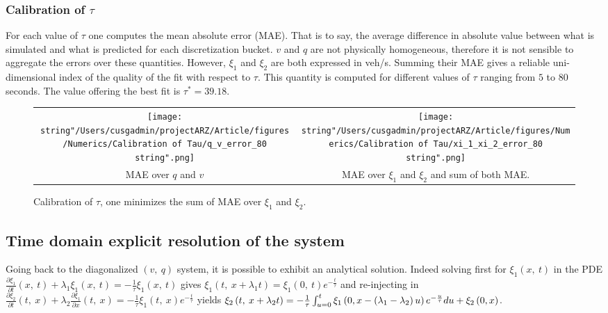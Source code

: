 \documentclass[preprint]{elsarticle}
\begin{document}
\subsubsection{Calibration of $\tau$\label{sub:Calibration-of-tau}}

For each value of $\tau$ one computes the mean absolute error (MAE).
That is to say, the average difference in absolute value between what
is simulated and what is predicted for each discretization bucket.
$v$ and $q$ are not physically homogeneous, therefore it is not
sensible to aggregate the errors over these quantities. However, $\xi_{1}$
and $\xi_{2}$ are both expressed in veh/s. Summing their MAE gives
a reliable uni-dimensional index of the quality of the fit with respect
to $\tau$. This quantity is computed for different values of $\tau$
ranging from $5$ to $80$ seconds. The value offering the best fit
is $\tau^{*}=39.18$.

\begin{figure}
\begin{centering}
\begin{tabular}{cc}
\texttt{[image: \\string"/Users/cusgadmin/projectARZ/Article/figures/Numerics/Calibration of Tau/q\_v\_error\_80\\string".png]} & \texttt{[image: \\string"/Users/cusgadmin/projectARZ/Article/figures/Numerics/Calibration of Tau/xi\_1\_xi\_2\_error\_80\\string".png]}\tabularnewline
MAE over $q$ and $v$ & MAE over $\xi_{1}$ and $\xi_{2}$ and sum of both MAE.\tabularnewline
\end{tabular}
\par\end{centering}

\protect\caption{Calibration of $\tau$, one minimizes the sum of MAE over $\xi_{1}$
and $\xi_{2}$.}
\end{figure}



\subsection{Time domain explicit resolution of the system \label{sub:Time-domain-explicit}}

Going back to the diagonalized $\left(v,\: q\right)$ system, it is
possible to exhibit an analytical solution. Indeed solving first for
$\xi_{1}\left(x,\: t\right)$ in the PDE $\frac{\partial\xi_{1}}{\partial t}\left(x,\: t\right)+\lambda_{1}\xi_{1}\left(x,\: t\right)=-\frac{1}{\tau}\xi_{1}\left(x,\: t\right)$
gives $\xi_{1}\left(t,\: x+\lambda_{1}t\right)=\xi_{1}\left(0,\: t\right)e^{-\frac{t}{\tau}}$
and re-injecting in $\frac{\partial\xi_{2}}{\partial t}\left(t,\: x\right)+\lambda_{2}\frac{\partial\xi_{1}}{\partial x}\left(t,\: x\right)=-\frac{1}{\tau}\xi_{1}\left(t,\: x\right)e^{-\frac{t}{\tau}}$
yields $\xi_{2}\left(t,\: x+\lambda_{2}t\right)=-\frac{1}{\tau}\intop_{u=0}^{t}\xi_{1}\left(0,x-\left(\lambda_{1}-\lambda_{2}\right)u\right)e^{-\frac{u}{\tau}}du+\xi_{2}\left(0,x\right)$.
\end{document}

